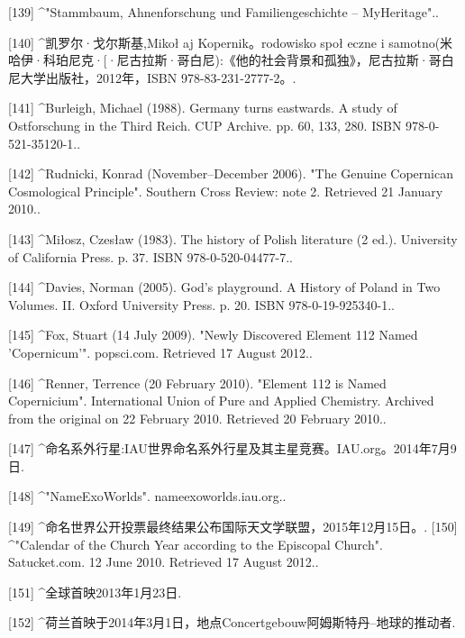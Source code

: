 [139]
^"Stammbaum, Ahnenforschung und Familiengeschichte – MyHeritage"..

[140]
^凯罗尔·戈尔斯基,Mikoł aj Kopernik。rodowisko społ eczne i samotno(米哈伊·科珀尼克·[·尼古拉斯·哥白尼):《他的社会背景和孤独》，尼古拉斯·哥白尼大学出版社，2012年，ISBN 978-83-231-2777-2。.

[141]
^Burleigh, Michael (1988). Germany turns eastwards. A study of Ostforschung in the Third Reich. CUP Archive. pp. 60, 133, 280. ISBN 978-0-521-35120-1..

[142]
^Rudnicki, Konrad (November–December 2006). "The Genuine Copernican Cosmological Principle". Southern Cross Review: note 2. Retrieved 21 January 2010..

[143]
^Miłosz, Czesław (1983). The history of Polish literature (2 ed.). University of California Press. p. 37. ISBN 978-0-520-04477-7..

[144]
^Davies, Norman (2005). God's playground. A History of Poland in Two Volumes. II. Oxford University Press. p. 20. ISBN 978-0-19-925340-1..

[145]
^Fox, Stuart (14 July 2009). "Newly Discovered Element 112 Named 'Copernicum'". popsci.com. Retrieved 17 August 2012..

[146]
^Renner, Terrence (20 February 2010). "Element 112 is Named Copernicium". International Union of Pure and Applied Chemistry. Archived from the original on 22 February 2010. Retrieved 20 February 2010..

[147]
^命名系外行星:IAU世界命名系外行星及其主星竞赛。IAU.org。2014年7月9日.

[148]
^"NameExoWorlds". nameexoworlds.iau.org..

[149]
^命名世界公开投票最终结果公布国际天文学联盟，2015年12月15日。.
[150]
^"Calendar of the Church Year according to the Episcopal Church". Satucket.com. 12 June 2010. Retrieved 17 August 2012..

[151]
^全球首映2013年1月23日.

[152]
^荷兰首映于2014年3月1日，地点Concertgebouw阿姆斯特丹--地球的推动者.